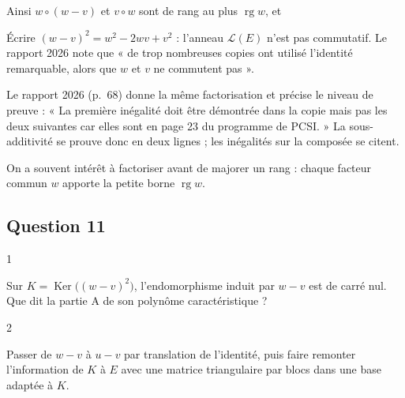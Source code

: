 \documentclass[11pt,a4paper]{article}
\newcommand{\equationajustee}[1]{%
  \sbox{\boiteequation}{$\displaystyle #1$}%
  \ifdim\wd\boiteequation>\linewidth
    \[\resizebox{\linewidth}{!}{\usebox{\boiteequation}}\]%
  \else
    \[#1\]%
  \fi}
\begin{document}
Ainsi \(w\circ(w-v)\) et \(v\circ w\) sont de rang au plus \(\operatorname{rg}w\), et
\equationajustee{\operatorname{rg}\big((w-v)^2\big)\le2\operatorname{rg}w<\frac n2.}
\equationajustee{\boxed{\operatorname{rg}\big((w-v)^2\big)<\frac n2.}}

\begin{piege}

Écrire \((w-v)^2=w^2-2wv+v^2\) : l'anneau \(\mathcal L(E)\) n'est pas commutatif. Le rapport 2026 note que « de trop nombreuses copies ont utilisé l'identité remarquable, alors que \(w\) et \(v\) ne commutent pas ».

\end{piege}

\begin{jury}

Le rapport 2026 (p.~68) donne la même factorisation et précise le niveau de preuve : « La première inégalité doit être démontrée dans la copie mais pas les deux suivantes car elles sont en page 23 du programme de PCSI. » La sous-additivité se prouve donc en deux lignes ; les inégalités sur la composée se citent.

\end{jury}

\begin{methode}

On a souvent intérêt à factoriser avant de majorer un rang : chaque facteur commun \(w\) apporte la petite borne \(\operatorname{rg}w\).

\end{methode}

\hypertarget{question-11}{%
\subsection{Question 11}\label{question-11}}

\begin{indication}{1}

Sur \(K=\operatorname{Ker}\big((w-v)^2\big)\), l'endomorphisme induit par \(w-v\) est de carré nul. Que dit la partie A de son polynôme caractéristique ?

\end{indication}

\begin{indication}{2}

Passer de \(w-v\) à \(u-v\) par translation de l'identité, puis faire remonter l'information de \(K\) à \(E\) avec une matrice triangulaire par blocs dans une base adaptée à \(K\).

\end{indication}
\end{document}
